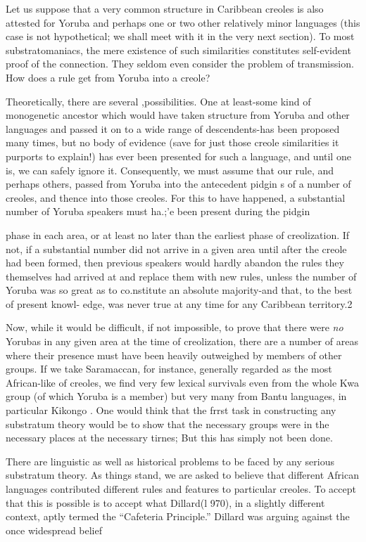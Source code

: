 Let us suppose that a very common structure in Caribbean creoles is also attested for Yoruba and perhaps one or two other rela\-tively minor languages (this case is not hypothetical; we shall meet with it in the very next section). To most substratomaniacs, the mere existence of such similarities constitutes self-evident proof of the connection. They seldom even consider the problem of transmission. How does a rule get from Yoruba into a creole?

Theoretically, there are several ,possibilities. One at least-some kind of monogenetic ancestor which would have taken structure from Yoruba and other languages and passed it on to a wide range of descen\-dents-has been proposed many times, but no body of evidence (save for just those creole similarities it purports to explain!) has ever been presented for such a language, and until one is, we can safely ignore it. Consequently, we must assume that our rule, and perhaps others, passed from Yoruba into the antecedent pidgin s of a number of creoles, and thence into those creoles. For this to have happened, a substantial number of Yoruba speakers must ha.;'e been present during the pidgin


phase in each area, or at least no later than the earliest phase of creoli\-zation. If not, if a substantial number did not arrive in a given area until after the creole had been formed, then previous speakers would hardly abandon the rules they themselves had arrived at and replace them with new rules, unless the number of Yoruba was so great as to co.nstitute an absolute majority-and that, to the best of present knowl- edge, was never true at any time for any Caribbean territory.2

Now, while it would be difficult, if not impossible, to prove that there were \textit{no} Yorubas in any given area at the time of creolization, there are a number of areas where their presence must have been heavily outweighed by members of other groups. If we take Sara\-maccan, for instance, generally regarded as the most African-like of creoles, we find very few lexical survivals even from the whole Kwa group (of which Yoruba is a member) but very many from Bantu lan\-guages, in particular Kikongo \citep{Daeleman1972}. One would think that the frrst task in constructing any substratum theory would be to show that the necessary groups were in the necessary places at the necessary tirnes; But this has simply not been done.

There are linguistic as well as historical problems to be faced by any serious substratum theory. As things stand, we are asked to believe that different African languages contributed different rules and features to particular creoles. To accept that this is possible is to accept what Dillard(l 970), in a slightly different context, aptly termed the ``Cafe\-teria Principle.'' Dillard was arguing against the once widespread belief

